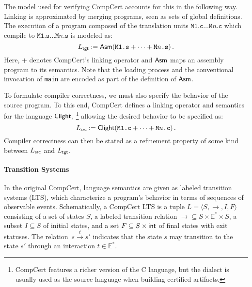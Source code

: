 \documentclass[sigplan,screen]{acmart}
\newcommand{\opt}[2]{#1}
\newcommand{\opt}[2]{#2}
\begin{document}
The model used for verifying CompCert accounts for this
    {in the following way.}
Linking is approximated by
merging programs, seen as sets of global definitions.
The execution
of a program composed of the translation units
$\texttt{M1.c} \ldots \texttt{M$n$.c}$
which compile to
$\texttt{M1.s} \ldots \texttt{M$n$.s}$
is modeled as:
\[
    L_{ \mathsf{tgt} } :=
     \mathsf{Asm} (\texttt{M1.s} +
             \cdots +
             \texttt{M$n$.s}) \,.
\]
Here,
$+$ denotes CompCert's linking operator and
$ \mathsf{Asm} $ maps an assembly program to its semantics.
Note that the loading process
and the conventional invocation of \texttt{main}
are encoded as part of the definition of $ \mathsf{Asm} $.

To formulate compiler correctness,
we must also specify the behavior of the source program.
To this end,
CompCert defines a linking operator
and semantics
for the language $ \mathsf{Clight} $,%
\footnote{
  CompCert features a richer version of the C language,
  but the dialect 
  is usually used as the source language
  when building certified artifacts.
}
allowing the desired behavior to be specified as:
\[
    L_{ \mathsf{src} } :=
     \mathsf{Clight} (\texttt{M1.c} + \cdots + \texttt{M$n$.c}) \,.
\]
Compiler correctness
can then be stated as
a refinement property of some kind
between $L_{ \mathsf{src} }$ and $L_{ \mathsf{tgt} }$.


\paragraph{Transition Systems} %

In the original CompCert, language semantics are
given as labeled transition systems (LTS),
which characterize a program's behavior in terms of
sequences of observable events.
Schematically, a CompCert LTS
is a tuple
$L = \langle S, {\rightarrow}, I, F \rangle$
consisting of
a set of states $S$,
a labeled transition relation
${\rightarrow} \subseteq S \times \mathbb{E}^* \times S$,
a subset $I \subseteq S$ of initial states,
and a set
$F \subseteq S \times  \mathsf{int} $
of final states with exit statuses.
The relation~$s \stackrel{t}{\rightarrow} s'$
indicates that the state $s$ may transition to the state $s'$
through an interaction $t \in \mathbb{E}^*$.
\end{document}
